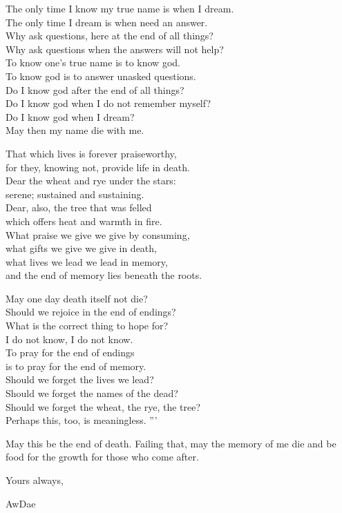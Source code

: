 The only time I know my true name is when I dream.\\
The only time I dream is when need an answer.\\
Why ask questions, here at the end of all things?\\
Why ask questions when the answers will not help?\\
To know one's true name is to know god.\\
To know god is to answer unasked questions.\\
Do I know god after the end of all things?\\
Do I know god when I do not remember myself?\\
Do I know god when I dream?\\
May then my name die with me.

That which lives is forever praiseworthy,\\
for they, knowing not, provide life in death.\\
Dear the wheat and rye under the stars:\\
serene; sustained and sustaining.\\
Dear, also, the tree that was felled\\
which offers heat and warmth in fire.\\
What praise we give we give by consuming,\\
what gifts we give we give in death,\\
what lives we lead we lead in memory,\\
and the end of memory lies beneath the roots.

May one day death itself not die?\\
Should we rejoice in the end of endings?\\
What is the correct thing to hope for?\\
I do not know, I do not know.\\
To pray for the end of endings\\
is to pray for the end of memory.\\
Should we forget the lives we lead?\\
Should we forget the names of the dead?\\
Should we forget the wheat, the rye, the tree?\\
Perhaps this, too, is meaningless. '''

May this be the end of death. Failing that, may the memory of me die and be food for the growth for those who come after.

Yours always,

AwDae
